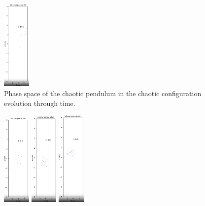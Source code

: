 \documentclass[11pt]{article} %
\begin{document}
\begin{figure}[H]
        \includegraphics[width=0.12\textwidth]{phase_5.png}
        \caption{Phase space of the chaotic pendulum in the chaotic configuration evolution through time.}
    \end{figure}
    \begin{figure}[H]
        \centering
        \includegraphics[width=0.12\textwidth]{phase_0A.png}
        \includegraphics[width=0.12\textwidth]{phase_1A.png}
        \includegraphics[width=0.12\textwidth]{phase_2A.png}

\end{figure}
\end{document}
